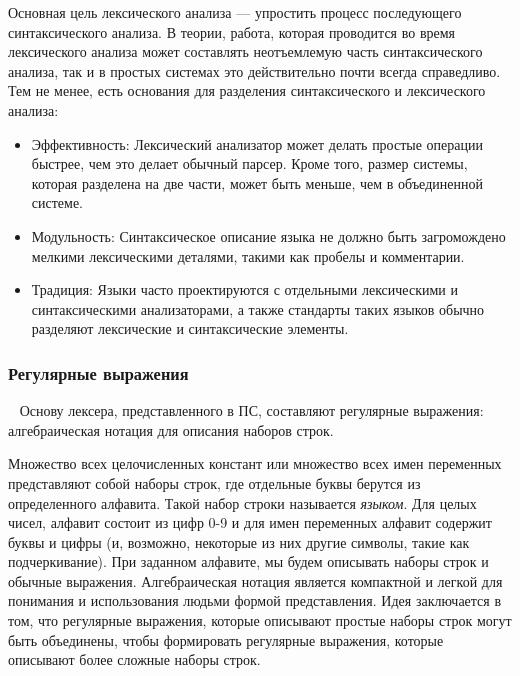 Основная цель лексического анализа --- упростить процесс последующего синтаксического анализа. В теории, работа, которая проводится во время лексического анализа может
составлять неотъемлемую часть синтаксического анализа, так и в простых системах это действительно почти всегда справедливо. Тем не менее, есть основания для разделения синтаксического и лексического анализа:
\begin{itemize}
\item
  Эффективность: Лексический анализатор может делать простые операции быстрее, чем это делает обычный парсер. Кроме того, размер системы, которая разделена на две части, может
  быть меньше, чем в объединенной системе.
\item
  Модульность: Синтаксическое описание языка не должно быть загромождено мелкими лексическими деталями, такими как пробелы и комментарии.
\item
  Традиция: Языки часто проектируются с отдельными лексическими и синтаксическими анализаторами, а также стандарты таких языков обычно разделяют лексические и синтаксические элементы.
\end{itemize}
\subsubsection{Регулярные выражения}~
\label{sec:arch_and_mod:regex}
Основу лексера, представленного в ПС, составляют регулярные выражения: алгебраическая нотация для описания наборов строк\cite{regular_expressions_tutorial}.

Множество всех целочисленных констант или множество всех имен переменных представляют собой наборы строк, где отдельные буквы берутся из определенного алфавита. Такой набор
строки называется \textit{языком}. Для целых чисел, алфавит состоит из цифр 0-9 и для имен переменных алфавит содержит буквы и цифры (и, возможно, некоторые из них
другие символы, такие как подчеркивание). При заданном алфавите, мы будем описывать наборы строк и обычные выражения. Алгебраическая нотация является компактной и легкой для понимания и использования людьми формой представления. Идея заключается в том, что регулярные выражения, которые описывают простые наборы строк могут быть объединены, чтобы формировать регулярные выражения, которые описывают более сложные наборы строк.

